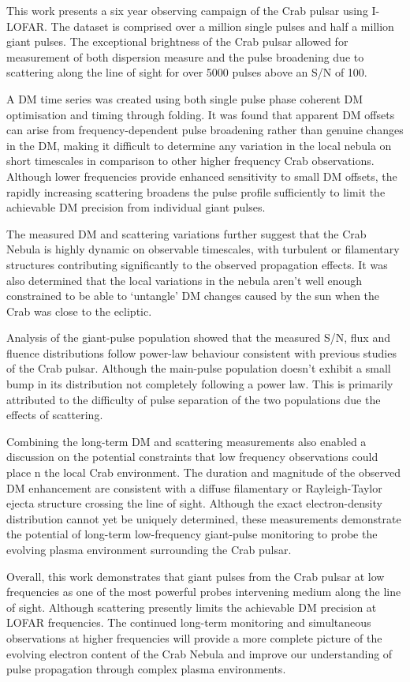 This work presents a six year observing campaign of the Crab pulsar using I-LOFAR. The dataset is comprised over a million single pulses and half a million giant pulses. The exceptional brightness of the Crab pulsar allowed for measurement of both dispersion measure and the pulse broadening due to scattering along the line of sight for over 5000 pulses above an S/N of 100.

A DM time series was created using both single pulse phase coherent DM optimisation and timing through folding. It was found that apparent DM offsets can arise from frequency-dependent pulse broadening rather than genuine changes in the DM, making it difficult to determine any variation in the local nebula on short timescales in comparison to other higher frequency Crab observations. Although lower frequencies provide enhanced sensitivity to small DM offsets, the rapidly increasing scattering broadens the pulse profile sufficiently to limit the achievable DM precision from individual giant pulses.

The measured DM and scattering variations further suggest that the Crab Nebula is highly dynamic on observable timescales, with turbulent or filamentary structures contributing significantly to the observed propagation effects. It was also determined that the local variations in the nebula aren't well enough constrained to be able to `untangle' DM changes caused by the sun when the Crab was close to the ecliptic. 

Analysis of the giant-pulse population showed that the measured S/N, flux and fluence distributions follow power-law behaviour consistent with previous studies of the Crab pulsar. Although the main-pulse population doesn't exhibit a small bump in its distribution not completely following a power law. This is primarily attributed to the difficulty of pulse separation of the two populations due the effects of scattering.

Combining the long-term DM and scattering measurements also enabled a discussion on the potential constraints that low frequency observations could place n the local Crab environment. The duration and magnitude of the observed DM enhancement are consistent with a diffuse filamentary or Rayleigh-Taylor ejecta structure crossing the line of sight. Although the exact electron-density distribution cannot yet be uniquely determined, these measurements demonstrate the potential of long-term low-frequency giant-pulse monitoring to probe the evolving plasma environment surrounding the Crab pulsar.

Overall, this work demonstrates that giant pulses from the Crab pulsar at low frequencies as one of the most powerful probes intervening medium along the line of sight. Although scattering presently limits the achievable DM precision at LOFAR frequencies. The continued long-term monitoring and simultaneous observations at higher frequencies will provide a more complete picture of the evolving electron content of the Crab Nebula and improve our understanding of pulse propagation through complex plasma environments.
